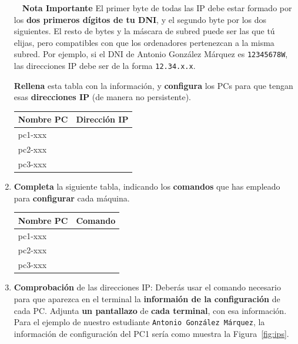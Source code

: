 \documentclass[a4paper]{article}
\begin{document}
\begin{enumerate}
	\begin{myredbox}{\faExclamationCircle~~\textbf{Nota Importante}}
		El primer byte de todas las IP debe estar formado  
		por los \textbf{dos primeros dígitos de tu DNI}, y el segundo byte por los dos siguientes.  El resto  
		de bytes y la máscara de subred puede ser las que tú elijas, pero compatibles con que los
		ordenadores pertenezcan a la misma subred. Por ejemplo, si el DNI de Antonio González 
		Márquez es \texttt{12345678W}, las direcciones IP debe ser de la forma \texttt{12.34.x.x}.
	\end{myredbox}
	\smallskip 
	
	\textbf{Rellena} esta tabla con la información, y \textbf{configura} los PCs para que tengan esas \textbf{direcciones IP} (de manera no persistente).
	\medskip
	
	\bgroup
	\def\arraystretch{1.5}%
	\begin{tabular}{|l|l|}
		\hline 
		\textbf{Nombre PC}& \textbf{Dirección IP} \\ 
		\hline 
		pc1-xxx &  \\ 
		\hline 
		pc2-xxx &  \\ 
		\hline 
		pc3-xxx &  \\ 
		\hline 
	\end{tabular} 
    \egroup
    \medskip
    
    \item \textbf{Completa} la siguiente tabla, indicando los \textbf{comandos} que has 
    empleado para \textbf{configurar} cada máquina.
    \medskip
    
    \bgroup
    \def\arraystretch{1.5}%
    \begin{tabular}{|l|l|}
    	\hline 
    	\textbf{Nombre PC}& \textbf{Comando} \\ 
    	\hline 
    	pc1-xxx &  \\ 
    	\hline 
    	pc2-xxx &  \\ 
    	\hline 
    	pc3-xxx &  \\ 
    	\hline 
    \end{tabular} 
    \egroup
    \medskip
	
	\item \textbf{Comprobación} de las direcciones IP: Deberás usar el comando necesario para que aparezca en el terminal la \textbf{informaión de la configuración} de cada PC. Adjunta \textbf{un pantallazo} de \textbf{cada terminal}, con esa información. Para el ejemplo de nuestro  estudiante \texttt{Antonio González Márquez}, la información de configuración del PC1 
	sería como muestra la Figura~\ref{fig:ips}.
	

\end{enumerate}
\end{document}
